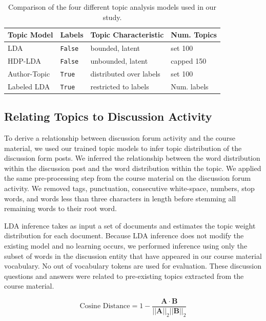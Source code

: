 \documentclass[sigconf, anonymous]{acmart}
\begin{document}
\begin{table}
    \centering
    \begin{tabularx}{\columnwidth}{@{}llll@{}}
    \toprule
    Topic Model & Labels & Topic Characteristic & Num. Topics \\
    \midrule
    LDA & \texttt{False} & bounded, latent & set 100 \\
    HDP-LDA & \texttt{False} & unbounded, latent  & capped 150 \\
    Author-Topic & \texttt{True} & distributed over labels & set 100 \\
    Labeled LDA & \texttt{True} & restricted to labels & Num. labels \\
    \bottomrule
    \end{tabularx}
    \caption{Comparison of the four different topic analysis models used in our study.}
    \label{tab:topic_models}
\end{table}

\subsection{Relating Topics to Discussion Activity}
To derive a relationship between discussion forum activity and the course material, we used our trained topic models to infer topic distribution of the discussion form posts.
We inferred the relationship between the word distribution within the discussion post and the word distribution within the topic.
We applied the same pre-processing step from the course material on the discussion forum activity. We removed tags, punctuation, consecutive white-space, numbers, stop words, and words less than three characters in length before stemming all remaining words to their root word.

LDA inference takes as input a set of documents and estimates the topic weight distribution for each document.
Because LDA inference does not modify the existing model and no learning occurs, we performed inference using only the subset of words in the discussion entity that have appeared in our course material vocabulary.
No out of vocabulary tokens are used for evaluation.
These discussion questions and answers were related to pre-existing topics extracted from the course material.

\begin{equation}
    \text{Cosine Distance} = 1 - \frac {\pmb A \cdot \pmb B}{||\pmb A||_2 ||\pmb B||_2}
    \label{eq:cos_distance}
\end{equation}
\end{document}
